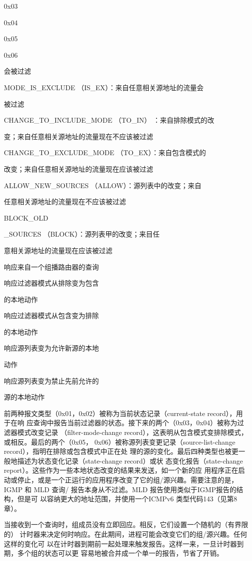 0x03

0x04

0x05

0x06

会被过滤

MODE\_IS\_EXCLUDE （IS\_EX）：来自任意相关源地址的流量会

被过滤

CHANGE\_TO\_INCLUDE\_MODE （TO\_IN） ：来自排除模式的改

变；来自任意相关源地址的流量现在不应该被过滤

CHANGE\_TO\_EXCLUDE\_MODE （TO\_EX）：来自包含模式的

改变；来自任意相关源地址的流量现在应该被过滤

ALLOW\_NEW\_SOURCES （ALLOW）：源列表中的改变；来自

任意相关源地址的流量现在不应该被过滤

BLOCK\_OLD

\_SOURCES （BLOCK）：源列表甲的改变；来目任

意相关源地址的流量现在应该被过滤

响应来自一个组播路由器的查询

响应过滤器模式从排除变为包含

的本地动作

响应过滤器模式从包含变为排除

的本地动作

响应源列表变为允许新源的本地

动作

响应源列表变为禁止先前允许的

源的本地动作

前两种报文类型（0x01，0x02）被称为当前状态记录（current-state record），用于在响
应查询中报告当前过滤器的状态。接下来的两个（0x03，0x04）被称为过滤器模式改变记录
（filter-mode-change record），这表明从包含模式变排除模式，或相反。最后的两个（0x05，
0x06）被称源列表变更记录（source-list-change record），指明在排除或包含模式中正在处
理的源的变化。最后四种类型也被更一般地描述为状态变化记录（state-change record）或状
态变化报告（state-change report）。这些作为一些本地状态改变的结果来发送，如一个新的应
用程序正在启动或停止，或是一个正运行的应用程序改变了它的组/源兴趣。需要注意的是，
IGMP 和 MLD 查询/ 报告本身从不过滤。MLD 报告使用类似于IGMP报告的结构，但是可
以容纳更大的地址范围，并使用一个ICMPv6 类型代码143（见第8章）。

当接收到一个查询时，组成员没有立即回应。相反，它们设置一个随机的（有界限的）
计时器来决定何时响应。在此期间，进程可能会改变它们的组/源兴趣。任何这样的变化可
以在计时器到期前一起处理来触发报告。这样一来，一旦计时器到期，多个组的状态可以更
容易地被合并成一个单一的报告，节省了开销。

